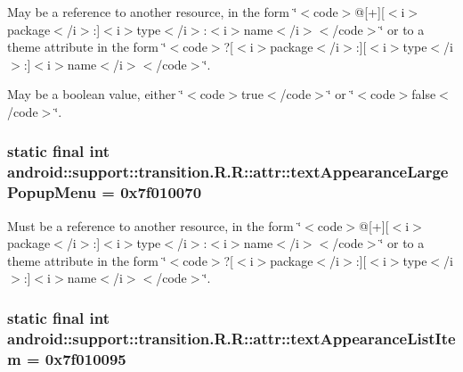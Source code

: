 May be a reference to another resource, in the form \char`\"{}$<$code$>$@\mbox{[}+\mbox{]}\mbox{[}$<$i$>$package$<$/i$>$:\mbox{]}$<$i$>$type$<$/i$>$:$<$i$>$name$<$/i$>$$<$/code$>$\char`\"{} or to a theme attribute in the form \char`\"{}$<$code$>$?\mbox{[}$<$i$>$package$<$/i$>$:\mbox{]}\mbox{[}$<$i$>$type$<$/i$>$:\mbox{]}$<$i$>$name$<$/i$>$$<$/code$>$\char`\"{}. 

May be a boolean value, either \char`\"{}$<$code$>$true$<$/code$>$\char`\"{} or \char`\"{}$<$code$>$false$<$/code$>$\char`\"{}. \hypertarget{classandroid_1_1support_1_1transition_1_1_r_1_1attr_87ce7570dff053409473b3447f46b8a0}{
\subsubsection[{textAppearanceLargePopupMenu}]{\setlength{\rightskip}{0pt plus 5cm}static final int android::support::transition.R.R::attr::textAppearanceLargePopupMenu = 0x7f010070}}
\label{classandroid_1_1support_1_1transition_1_1_r_1_1attr_87ce7570dff053409473b3447f46b8a0}


Must be a reference to another resource, in the form \char`\"{}$<$code$>$@\mbox{[}+\mbox{]}\mbox{[}$<$i$>$package$<$/i$>$:\mbox{]}$<$i$>$type$<$/i$>$:$<$i$>$name$<$/i$>$$<$/code$>$\char`\"{} or to a theme attribute in the form \char`\"{}$<$code$>$?\mbox{[}$<$i$>$package$<$/i$>$:\mbox{]}\mbox{[}$<$i$>$type$<$/i$>$:\mbox{]}$<$i$>$name$<$/i$>$$<$/code$>$\char`\"{}. \hypertarget{classandroid_1_1support_1_1transition_1_1_r_1_1attr_e6e1d8653f16a8b1f60467d97a49d092}{
\subsubsection[{textAppearanceListItem}]{\setlength{\rightskip}{0pt plus 5cm}static final int android::support::transition.R.R::attr::textAppearanceListItem = 0x7f010095}}
\label{classandroid_1_1support_1_1transition_1_1_r_1_1attr_e6e1d8653f16a8b1f60467d97a49d092}


